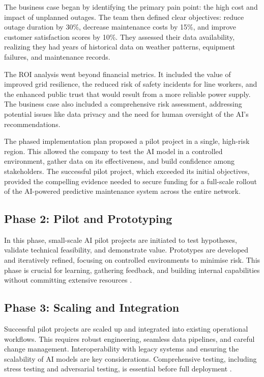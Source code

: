 The business case began by identifying the primary pain point: the high cost and impact of unplanned outages. The team then defined clear objectives: reduce outage duration by 30\%, decrease maintenance costs by 15\%, and improve customer satisfaction scores by 10\%. They assessed their data availability, realizing they had years of historical data on weather patterns, equipment failures, and maintenance records.

The ROI analysis went beyond financial metrics. It included the value of improved grid resilience, the reduced risk of safety incidents for line workers, and the enhanced public trust that would result from a more reliable power supply. The business case also included a comprehensive risk assessment, addressing potential issues like data privacy and the need for human oversight of the AI's recommendations.

The phased implementation plan proposed a pilot project in a single, high-risk region. This allowed the company to test the AI model in a controlled environment, gather data on its effectiveness, and build confidence among stakeholders. The successful pilot project, which exceeded its initial objectives, provided the compelling evidence needed to secure funding for a full-scale rollout of the AI-powered predictive maintenance system across the entire network.

\subsection{Phase 2: Pilot and Prototyping}

In this phase, small-scale AI pilot projects are initiated to test hypotheses, validate technical feasibility, and demonstrate value. Prototypes are developed and iteratively refined, focusing on controlled environments to minimise risk. This phase is crucial for learning, gathering feedback, and building internal capabilities without committing extensive resources \parencite{cisc2025artificial}.

\subsection{Phase 3: Scaling and Integration}

Successful pilot projects are scaled up and integrated into existing operational workflows. This requires robust engineering, seamless data pipelines, and careful change management. Interoperability with legacy systems and ensuring the scalability of AI models are key considerations. Comprehensive testing, including stress testing and adversarial testing, is essential before full deployment \parencite{dhs2024roles}.


